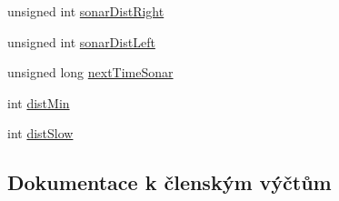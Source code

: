 \begin{DoxyCompactItemize}
\item 
unsigned int \hyperlink{class_sekacka_a207ffc8368c5d5fe4d43efeed0c924d0}{sonar\+Dist\+Right}
\item 
unsigned int \hyperlink{class_sekacka_ab7bdf6c96058d419c7d98b02893df638}{sonar\+Dist\+Left}
\item 
unsigned long \hyperlink{class_sekacka_a0ef81f7686a22c5f4e7fa004dfa14930}{next\+Time\+Sonar}
\item 
int \hyperlink{class_sekacka_ad2f7b8a0daa12b6749f0e6d3fc72987a}{dist\+Min}
\item 
int \hyperlink{class_sekacka_a129f7eb9e4d1476fcc40ed610604132a}{dist\+Slow}
\end{DoxyCompactItemize}


\subsection{Dokumentace k členským výčtům}
